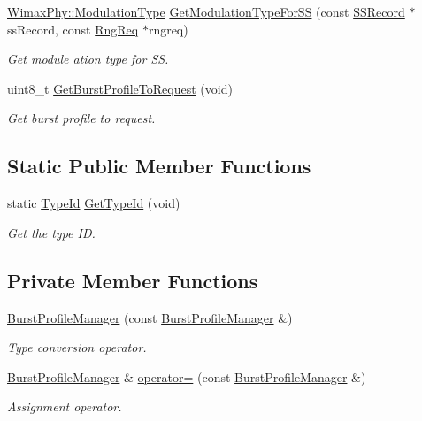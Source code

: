 \begin{DoxyCompactItemize}
\hyperlink{classns3_1_1WimaxPhy_a044c5d8a48ca992c39c2a946f6e755fa}{Wimax\+Phy\+::\+Modulation\+Type} \hyperlink{classns3_1_1BurstProfileManager_ab0febc21406f71fea501528cc0ffdef9}{Get\+Modulation\+Type\+For\+SS} (const \hyperlink{classns3_1_1SSRecord}{S\+S\+Record} $\ast$ss\+Record, const \hyperlink{classns3_1_1RngReq}{Rng\+Req} $\ast$rngreq)
\begin{DoxyCompactList}\small\item\em Get module ation type for SS. \end{DoxyCompactList}\item 
uint8\+\_\+t \hyperlink{classns3_1_1BurstProfileManager_aa3a8bea76b9da0541365225fa48d2616}{Get\+Burst\+Profile\+To\+Request} (void)
\begin{DoxyCompactList}\small\item\em Get burst profile to request. \end{DoxyCompactList}\end{DoxyCompactItemize}
\subsection*{Static Public Member Functions}
\begin{DoxyCompactItemize}
\item 
static \hyperlink{classns3_1_1TypeId}{Type\+Id} \hyperlink{classns3_1_1BurstProfileManager_ae1e217119d3139bfbd5a26ccb000978a}{Get\+Type\+Id} (void)
\begin{DoxyCompactList}\small\item\em Get the type ID. \end{DoxyCompactList}\end{DoxyCompactItemize}
\subsection*{Private Member Functions}
\begin{DoxyCompactItemize}
\item 
\hyperlink{classns3_1_1BurstProfileManager_a3ddcbf3439e4036f858083b5e8f0da96}{Burst\+Profile\+Manager} (const \hyperlink{classns3_1_1BurstProfileManager}{Burst\+Profile\+Manager} \&)
\begin{DoxyCompactList}\small\item\em Type conversion operator. \end{DoxyCompactList}\item 
\hyperlink{classns3_1_1BurstProfileManager}{Burst\+Profile\+Manager} \& \hyperlink{classns3_1_1BurstProfileManager_adcf20e3be76847efb4c8280a3f996fe1}{operator=} (const \hyperlink{classns3_1_1BurstProfileManager}{Burst\+Profile\+Manager} \&)
\begin{DoxyCompactList}\small\item\em Assignment operator. \end{DoxyCompactList}\end{DoxyCompactItemize}

